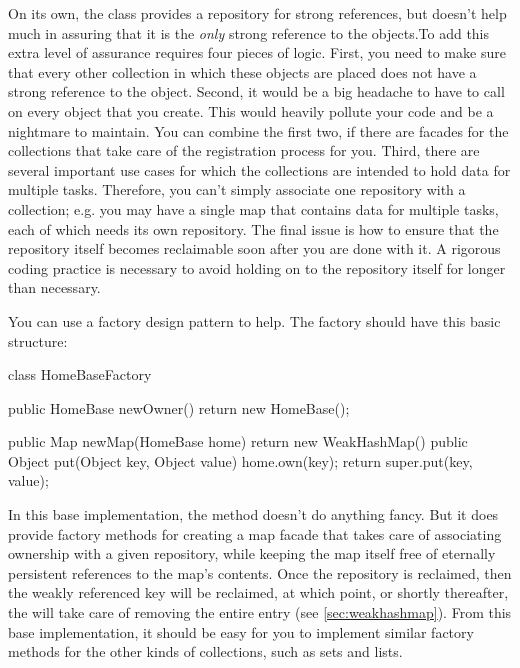 
On its own, the  class provides a repository for strong
references, but doesn't help much in assuring that it is the \emph{only} strong
reference to the objects.To add this extra level of assurance requires four
pieces of logic. First, you need to make sure that every other collection in
which these objects are placed does not have a strong reference to the object.
Second, it would be a big headache to have to call
 on every object that you create. This would
heavily pollute your code and be a nightmare to maintain. You can combine the
first two, if there are facades for the collections that take care of the
registration process for you. Third, there are several important use cases for
which the collections are intended to hold data for multiple tasks. Therefore,
you can't simply associate one  repository with a
collection; e.g. you may have a single map that contains data for multiple
tasks, each of which needs its own repository. The final issue is how to ensure
that the repository itself becomes reclaimable soon after you are done with it.
A rigorous coding practice is necessary to avoid holding on to the repository
itself for longer than necessary.

You can use a factory design pattern to help. The factory should have this basic
structure:
\begin{shortlisting}
class HomeBaseFactory {
   public HomeBase newOwner() {
      return new HomeBase();
   }

   public Map newMap(HomeBase home) {
      return new WeakHashMap() {
         public Object put(Object key, Object value) {
            home.own(key); return super.put(key, value);
         }
      }
   }
}
\end{shortlisting}
In this base implementation, the  method doesn't do anything
fancy. But it does provide factory methods for creating a map facade that takes
care of associating ownership with a given repository, while keeping the map
itself free of eternally persistent references to the map's contents. Once the
repository is reclaimed, then the weakly referenced key will be reclaimed, at
which point, or shortly thereafter, the  will take care of
removing the entire entry (see \autoref{sec:weakhashmap}). From this base
implementation, it should be easy for you to implement similar factory methods
for the other kinds of collections, such as sets and lists.

